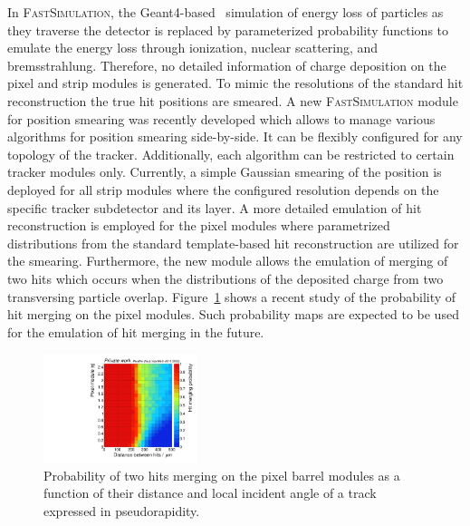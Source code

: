 \documentclass[a4paper]{jpconf}
\begin{document}
In \textsc{FastSimulation}, the Geant4-based~\cite{geant4} simulation of energy loss of particles as they traverse the detector is replaced by parameterized probability functions to emulate the energy loss through ionization, nuclear scattering, and bremsstrahlung. Therefore, no detailed information of charge deposition on the pixel and strip modules is generated. To mimic the resolutions of the standard hit reconstruction the true hit positions are smeared. A new \textsc{FastSimulation} module for position smearing was recently developed which allows to manage various algorithms for position smearing side-by-side. It can be flexibly configured for any topology of the tracker. Additionally, each algorithm can be restricted to certain tracker modules only. Currently, a simple Gaussian smearing of the position is deployed for all strip modules where the configured resolution depends on the specific tracker subdetector and its layer. A more detailed emulation of hit reconstruction is employed for the pixel modules where parametrized distributions from the standard template-based hit reconstruction are utilized for the smearing. Furthermore, the new module allows the emulation of merging of two hits which occurs when the distributions of the deposited charge from two transversing particle overlap. Figure~\ref{fig:merge} shows a recent study of the probability of hit merging on the pixel modules. Such probability maps are expected to be used for the emulation of hit merging in the future.

\begin{figure}[htbp]
\begin{center}
\includegraphics[width=0.4\textwidth]{figures/merge.pdf}
\caption{\label{fig:merge}Probability of two hits merging on the pixel barrel modules as a function of their distance and local incident angle of a track expressed in pseudorapidity.}
\end{center}
\end{figure}
\end{document}
